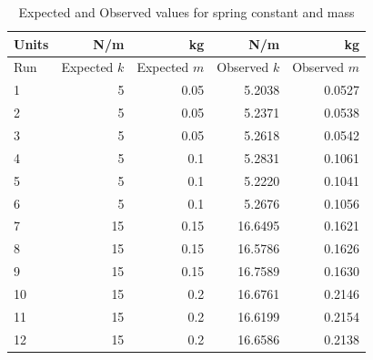 %
\begin{table}[ht]
    \centering
    \begin{tabular}{|l|r|r|r|r|}
        \hline
        Units & N/m & kg & N/m & kg \\
        \hline
        Run & Expected $k$ & Expected $m$ & Observed $k$ & Observed $m$ \\
        \hline
        1 & 5 & 0.05 & 5.2038 & 0.0527 \\
        2 & 5 & 0.05 & 5.2371 & 0.0538 \\
        3 & 5 & 0.05 & 5.2618 & 0.0542 \\
        \hline
        4 & 5 & 0.1 & 5.2831 & 0.1061 \\
        5 & 5 & 0.1 & 5.2220 & 0.1041 \\
        6 & 5 & 0.1 & 5.2676 & 0.1056 \\
        \hline
        7 & 15 & 0.15 & 16.6495 & 0.1621 \\
        8 & 15 & 0.15 & 16.5786 & 0.1626 \\
        9 & 15 & 0.15 & 16.7589 & 0.1630 \\
        \hline
        10 & 15 & 0.2 & 16.6761 & 0.2146 \\
        11 & 15 & 0.2 & 16.6199 & 0.2154 \\
        12 & 15 & 0.2 & 16.6586 & 0.2138 \\
        \hline
    \end{tabular}
    \caption{Expected and Observed values for spring constant and mass}
    \label{table.11.k.m}
\end{table}
%
